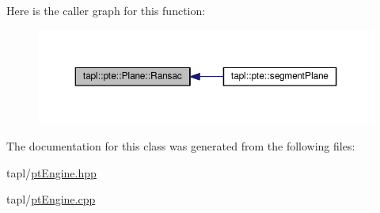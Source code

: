 Here is the caller graph for this function\+:\nopagebreak
\begin{figure}[H]
\begin{center}
\leavevmode
\includegraphics[width=350pt]{classtapl_1_1pte_1_1Plane_ad56c96d9b115a8a482e851c8139feb97_icgraph}
\end{center}
\end{figure}




The documentation for this class was generated from the following files\+:\begin{DoxyCompactItemize}
\item 
tapl/\hyperlink{ptEngine_8hpp}{pt\+Engine.\+hpp}\item 
tapl/\hyperlink{ptEngine_8cpp}{pt\+Engine.\+cpp}\end{DoxyCompactItemize}
